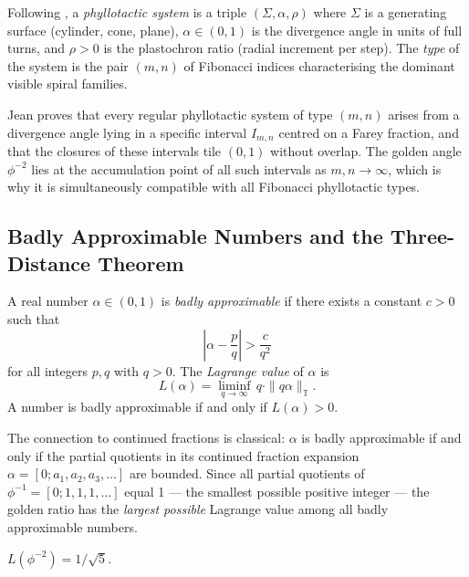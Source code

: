 \begin{definition}\label{def:phyllo-system}
Following \cite{jean1994phyllotaxis}, a \emph{phyllotactic system} is
a triple $(\Sigma, \alpha, \rho)$ where $\Sigma$ is a generating
surface (cylinder, cone, plane), $\alpha \in (0,1)$ is the divergence
angle in units of full turns, and $\rho > 0$ is the plastochron ratio
(radial increment per step).  The \emph{type} of the system is the
pair $(m,n)$ of Fibonacci indices characterising the dominant visible
spiral families.
\end{definition}

Jean \cite{jean1994phyllotaxis} proves that every regular phyllotactic
system of type $(m,n)$ arises from a divergence angle lying in a
specific interval $I_{m,n}$ centred on a Farey fraction, and that the
closures of these intervals tile $(0,1)$ without overlap.  The golden
angle $\phi^{-2}$ lies at the accumulation point of all such
intervals as $m,n \to \infty$, which is why it is simultaneously
compatible with all Fibonacci phyllotactic types.

\subsection{Badly Approximable Numbers and the Three-Distance Theorem}
\label{subsec:bad-approx}

\begin{definition}\label{def:bad-approx}
A real number $\alpha \in (0,1)$ is \emph{badly approximable} if there
exists a constant $c > 0$ such that
\[
  \left|\alpha - \frac{p}{q}\right| > \frac{c}{q^2}
\]
for all integers $p, q$ with $q > 0$.  The \emph{Lagrange value} of
$\alpha$ is
\[
  L(\alpha) = \liminf_{q \to \infty} \, q \cdot \|q\alpha\|_{\mathbb{T}}.
\]
A number is badly approximable if and only if $L(\alpha) > 0$.
\end{definition}

The connection to continued fractions is classical: $\alpha$ is badly
approximable if and only if the partial quotients in its continued
fraction expansion $\alpha = [0; a_1, a_2, a_3, \ldots]$ are bounded.
Since all partial quotients of $\phi^{-1} = [0; 1,1,1,\ldots]$ equal 1
— the smallest possible positive integer — the golden ratio has the
\emph{largest possible} Lagrange value among all badly approximable numbers.

\begin{proposition}
\label{prop:lagrange-phi}
$L(\phi^{-2}) = 1/\sqrt{5}$.
\end{proposition}

